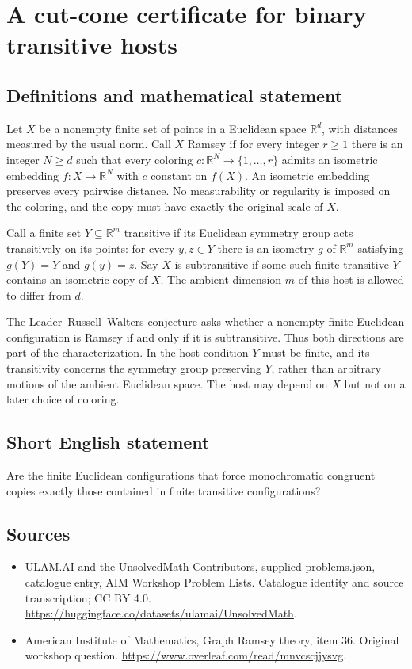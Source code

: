 \documentclass[11pt,a4paper]{article}
\begin{document}
\section*{A cut-cone certificate for binary transitive hosts}\label{statement}

\subsection{Definitions and mathematical statement}
Let $X$ be a nonempty finite set of points in a Euclidean space
$\mathbb R^d$, with distances measured by the usual norm. Call $X$
Ramsey if for every integer $r\ge1$ there is an integer $N\ge d$ such
that every coloring $c:\mathbb R^N\to\{1,\ldots,r\}$ admits an
isometric embedding $f:X\to\mathbb R^N$ with $c$ constant on $f(X)$.
An isometric embedding preserves every pairwise distance. No
measurability or regularity is imposed on the coloring, and the copy
must have exactly the original scale of $X$.

Call a finite set $Y\subseteq\mathbb R^m$ transitive if its Euclidean
symmetry group acts transitively on its points: for every $y,z\in Y$
there is an isometry $g$ of $\mathbb R^m$ satisfying $g(Y)=Y$ and
$g(y)=z$. Say $X$ is subtransitive if some such finite transitive $Y$
contains an isometric copy of $X$. The ambient dimension $m$ of this
host is allowed to differ from $d$.

The Leader--Russell--Walters conjecture asks whether a nonempty finite
Euclidean configuration is Ramsey if and only if it is subtransitive.
Thus both directions are part of the characterization. In the host
condition $Y$ must be finite, and its transitivity concerns the symmetry
group preserving $Y$, rather than arbitrary motions of the ambient
Euclidean space. The host may depend on $X$ but not on a later choice
of coloring.
\subsection{Short English statement}
Are the finite Euclidean configurations that force monochromatic congruent copies exactly those contained in finite transitive configurations?
\subsection{Sources}
\begin{itemize}
\item[S1] ULAM.AI and the UnsolvedMath Contributors, supplied problems.json, catalogue entry, AIM Workshop Problem Lists. Catalogue identity and source transcription; CC BY 4.0.
\url{https://huggingface.co/datasets/ulamai/UnsolvedMath}.
\item[S2] American Institute of Mathematics, Graph Ramsey theory, item 36. Original workshop question.
\url{https://www.overleaf.com/read/mnvcscjjysvg}.
\end{itemize}
\end{document}
